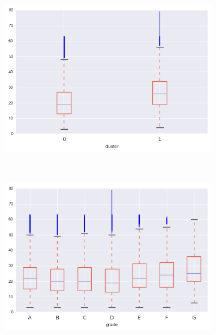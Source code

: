 \begin{anexosenv}
\begin{figure}[t!]
\begin{subfigure}[t]{0.5\textwidth}
            \centerline{\includegraphics[width=1.05\textwidth]{img/total_acc_by_cluster}}
        \end{subfigure}%
        ~ 
        \begin{subfigure}[t]{0.5\textwidth}
            \centering
   
            \centerline{\includegraphics[width=1.05\textwidth]{img/total_acc_by_grade}}

        \end{subfigure}
\\
                \caption{out\textunderscore prncp}
        \begin{subfigure}[t]{0.5\textwidth}
            \centering


\end{subfigure}
\end{figure}
\end{anexosenv}
